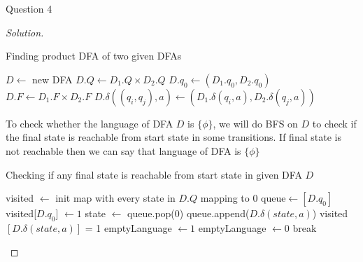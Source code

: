 \begin{solution}{Question 4}
\begin{proof}[Solution]
        \begin{algorithm}[H]
            \caption{Finding product DFA of two given DFAs}
            \begin{algorithmic}[1]
                    \State $D \gets$ new DFA
                    \State $D.Q \gets D_1.Q \times D_2.Q$
                    \State $D.q_0 \gets (D_1.q_0, D_2.q_0)$
                    \State $D.F \gets D_1.F \times D_2.F$
                            \State $D.\delta((q_i, q_j), a) \gets (D_1.\delta(q_i, a), D_2.\delta(q_j, a))$
                        \EndFor{}
                    \EndFor{}
                \EndProcedure{}
            \end{algorithmic}
        \end{algorithm}
        
        To check whether the language of DFA $D$ is $\{\phi\}$, we will do BFS on $D$ to check if the final state is reachable from start state in some transitions. If final state is not reachable then we can say that language of DFA is $\{\phi\}$
        
        \begin{algorithm}[H]
            \caption{Checking if any final state is reachable from start state in given DFA $D$}
            \begin{algorithmic}[1]
                    \State visited $\gets$ init map with every state in $D.Q$ mapping to $0$
                    \State queue$\gets [D.q_0]$
                    \State visited[$D.q_0$] $\gets 1$
                    \State
                        \State state $\gets$ queue.pop(0)
                                \State queue.append($D.\delta(state, a)$)
                                \State visited$[D.\delta(state, a)]$ = 1
                            \EndIf{}
                        \EndFor{}
                    \EndWhile
                    \State
                    \State emptyLanguage $\gets 1$
                            \State emptyLanguage $\gets 0$
                            \State break
                        \EndIf{}
                    \EndFor{}
                    \State 
                \EndProcedure{}
            \end{algorithmic}
        \end{algorithm}
        

\end{proof}
\end{solution}
